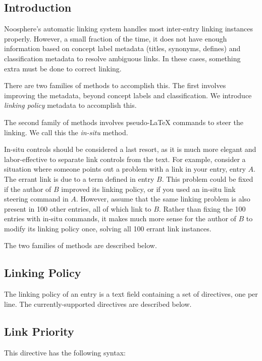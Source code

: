 \subsection*{Introduction}

Noosphere's automatic linking system handles most inter-entry linking instances properly. However, a small fraction of the time, it does not have enough information based on concept label metadata (titles, synonyms, defines) and classification metadata to resolve ambiguous links. In these cases, something extra must be done to correct linking.

There are two families of methods to accomplish this. The first involves improving the metadata, beyond concept labels and classification. We introduce \emph{linking policy} metadata to accomplish this.

The second family of methods involves pseudo-\LaTeX{} commands to steer the linking. We call this the \emph{in-situ} method.

In-situ controls should be considered a last resort, as it is much more elegant and labor-effective to separate link controls from the text. For example, consider a situation where someone points out a problem with a link in your entry, entry $A$. The errant link is due to a term defined in entry $B$. This problem could be fixed if the author of $B$ improved its linking policy, or if you used an in-situ link steering command in $A$. However, assume that the same linking problem is also present in 100 other entries, all of which link to $B$. Rather than fixing the 100 entries with in-situ commands, it makes much more sense for the author of $B$ to modify its linking policy once, solving all 100 errant link instances.

The two families of methods are described below.

\subsection*{Linking Policy}

The linking policy of an entry is a text field containing a set of directives, one per line. The currently-supported directives are described below.

\subsection{Link Priority}

This directive has the following syntax:


